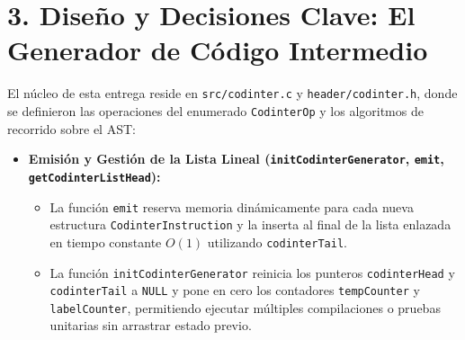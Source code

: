 \documentclass[12pt, a4paper]{article}
\begin{document}
\section{3. Diseño y Decisiones Clave: El Generador de Código Intermedio}
El núcleo de esta entrega reside en \texttt{src/codinter.c} y \texttt{header/codinter.h}, donde se definieron las operaciones del enumerado \texttt{CodinterOp} y los algoritmos de recorrido sobre el AST:

\begin{itemize}
    \item \textbf{Emisión y Gestión de la Lista Lineal (\texttt{initCodinterGenerator}, \texttt{emit}, \texttt{getCodinterListHead}):}
    \begin{itemize}
        \item La función \texttt{emit} reserva memoria dinámicamente para cada nueva estructura \texttt{CodinterInstruction} y la inserta al final de la lista enlazada en tiempo constante $O(1)$ utilizando \texttt{codinterTail}.
        \item La función \texttt{initCodinterGenerator} reinicia los punteros \texttt{codinterHead} y \texttt{codinterTail} a \texttt{NULL} y pone en cero los contadores \texttt{tempCounter} y \texttt{labelCounter}, permitiendo ejecutar múltiples compilaciones o pruebas unitarias sin arrastrar estado previo.
    \end{itemize}


\end{itemize}
\end{document}

